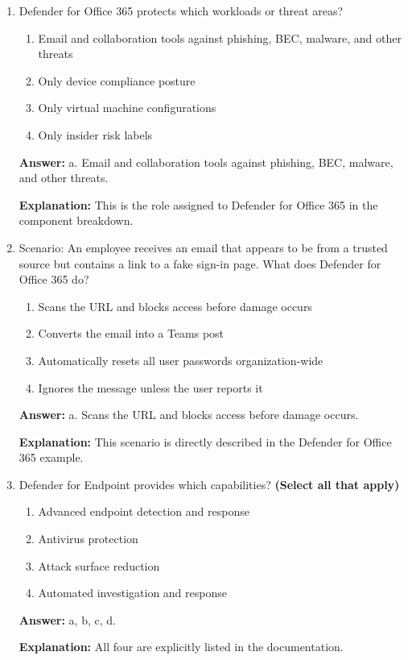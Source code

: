 \documentclass[10pt]{article}
\begin{document}
\begin{enumerate}[leftmargin=*]
\item Defender for Office 365 protects which workloads or threat areas?
\begin{enumerate}[label=\alph*., leftmargin=1.5em]
\item Email and collaboration tools against phishing, BEC, malware, and other threats
\item Only device compliance posture
\item Only virtual machine configurations
\item Only insider risk labels
\end{enumerate}
\textbf{Answer:} a. Email and collaboration tools against phishing, BEC, malware, and other threats.

\textbf{Explanation:} This is the role assigned to Defender for Office 365 in the component breakdown.

\item Scenario: An employee receives an email that appears to be from a trusted source but contains a link to a fake sign-in page. What does Defender for Office 365 do?
\begin{enumerate}[label=\alph*., leftmargin=1.5em]
\item Scans the URL and blocks access before damage occurs
\item Converts the email into a Teams post
\item Automatically resets all user passwords organization-wide
\item Ignores the message unless the user reports it
\end{enumerate}
\textbf{Answer:} a. Scans the URL and blocks access before damage occurs.

\textbf{Explanation:} This scenario is directly described in the Defender for Office 365 example.

\item Defender for Endpoint provides which capabilities? \textbf{(Select all that apply)}
\begin{enumerate}[label=\alph*., leftmargin=1.5em]
\item Advanced endpoint detection and response
\item Antivirus protection
\item Attack surface reduction
\item Automated investigation and response
\end{enumerate}
\textbf{Answer:} a, b, c, d.

\textbf{Explanation:} All four are explicitly listed in the documentation.


\end{enumerate}
\end{document}
